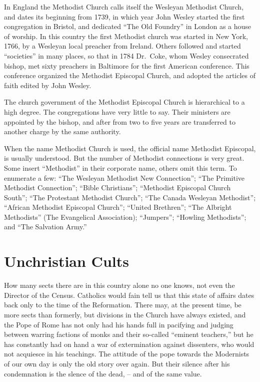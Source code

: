\documentclass[
]{book}
\begin{document}
In England the Methodist Church calls itself the Wesleyan Methodist Church, and dates its beginning from 1739, in which year John Wesley started the first congregation in Bristol, and dedicated ``The Old Foundry'' in London as a house of worship. In this country the first Methodist church was started in New York, 1766, by a Wesleyan local preacher from Ireland. Others followed and started ``societies'' in many places, so that in 1784 Dr.~Coke, whom Wesley consecrated bishop, met sixty preachers in Baltimore for the first American conference. This conference organized the Methodist Episcopal Church, and adopted the articles of faith edited by John Wesley.

The church government of the Methodist Episcopal Church is hierarchical to a high degree. The congregations have very little to say. Their ministers are appointed by the bishop, and after from two to five years are transferred to another charge by the same authority.

When the name Methodist Church is used, the official name Methodist Episcopal, is usually understood. But the number of Methodist connections is very great. Some insert ``Methodist'' in their corporate name, others omit this term. To enumerate a few: ``The Wesleyan Methodist New Connection''; ``The Primitive Methodist Connection''; ``Bible Christians''; ``Methodist Episcopal Church South''; ``The Protestant Methodist Church''; ``The Canada Wesleyan Methodist''; ``African Methodist Episcopal Church''; ``United Brethren''; ``The Albright Methodists'' (The Evangelical Association); ``Jumpers''; ``Howling Methodists''; and ``The Salvation Army.''

\section{Unchristian Cults}\label{unchristian-cults}

How many sects there are in this country alone no one knows, not even the Director of the Census. Catholics would fain tell us that this state of affairs dates back only to the time of the Reformation. There may, at the present time, be more sects than formerly, but divisions in the Church have always existed, and the Pope of Rome has not only had his hands full in pacifying and judging between warring factions of monks and their so-called ``eminent teachers,'' but he has constantly had on hand a war of extermination against dissenters, who would not acquiesce in his teachings. The attitude of the pope towards the Modernists of our own day is only the old story over again. But their silence after his condemnation is the slence of the dead, -- and of the same value.
\end{document}
